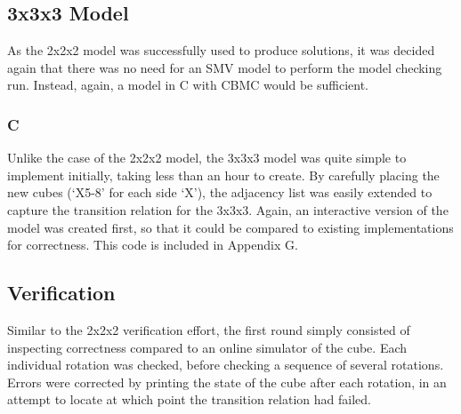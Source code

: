 \documentclass{article}
\begin{document}
\subsection {3x3x3 Model}

As the 2x2x2 model was successfully used to produce solutions, it was decided again that there was no need for an SMV model to perform the model checking run. Instead, again, a model in C with CBMC would be sufficient.

\subsubsection {C}

Unlike the case of the 2x2x2 model, the 3x3x3 model was quite simple to implement initially, taking less than an hour to create. By carefully placing the new cubes (`X5-8' for each side `X'), the adjacency list was easily extended to capture the transition relation for the 3x3x3. Again, an interactive version of the model was created first, so that it could be compared to existing implementations for correctness. This code is included in Appendix G.

\subsection {Verification}

Similar to the 2x2x2 verification effort, the first round simply consisted of inspecting correctness compared to an online simulator of the cube. Each individual rotation was checked, before checking a sequence of several rotations. Errors were corrected by printing the state of the cube after each rotation, in an attempt to locate at which point the transition relation had failed.\\
\end{document}
